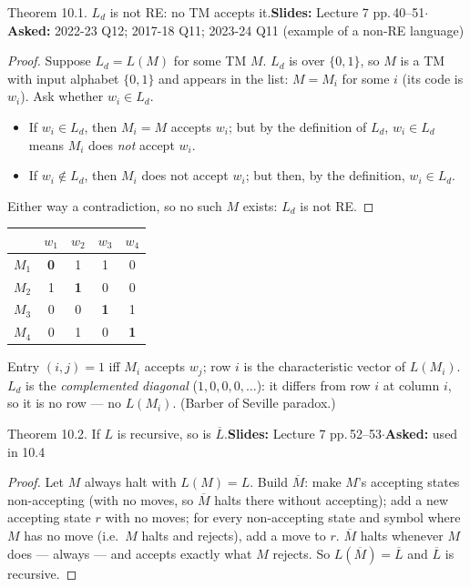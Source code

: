 \documentclass[10.5pt,a4paper]{article}
\newcommand{\src}[2]{{\footnotesize\color{gray!70!black}\textbf{Slides:} #1\enspace$\cdot$\enspace\textbf{Asked:} #2}\par}
\newcommand{\Ld}{L_d}
\begin{document}
\begin{thm}{Theorem 10.1. $\Ld$ is not RE: no TM accepts it.}\src{Lecture 7 pp.\,40--51}{2022-23 Q12; 2017-18 Q11; 2023-24 Q11 (example of a non-RE language)}\end{thm}
\begin{proof}
Suppose $\Ld=L(M)$ for some TM $M$. $\Ld$ is over $\{0,1\}$, so $M$ is a TM with input alphabet $\{0,1\}$ and appears in the list: $M=M_i$
for some $i$ (its code is $w_i$). Ask whether $w_i\in\Ld$.
\begin{itemize}
\item If $w_i\in\Ld$, then $M_i=M$ accepts $w_i$; but by the definition of $\Ld$, $w_i\in\Ld$ means $M_i$ does \emph{not} accept $w_i$.
\item If $w_i\notin\Ld$, then $M_i$ does not accept $w_i$; but then, by the definition, $w_i\in\Ld$.
\end{itemize}
Either way a contradiction, so no such $M$ exists: $\Ld$ is not RE.
\end{proof}
\begin{center}\small
\begin{tabular}{c|cccc}
 & $w_1$ & $w_2$ & $w_3$ & $w_4$ \\\hline
$M_1$ & \textbf{\color{trapborder}0} & 1 & 1 & 0\\
$M_2$ & 1 & \textbf{\color{trapborder}1} & 0 & 0\\
$M_3$ & 0 & 0 & \textbf{\color{trapborder}1} & 1\\
$M_4$ & 0 & 1 & 0 & \textbf{\color{trapborder}1}
\end{tabular}\qquad
\begin{minipage}{0.5\linewidth}\footnotesize
Entry $(i,j)=1$ iff $M_i$ accepts $w_j$; row $i$ is the characteristic vector of $L(M_i)$. $\Ld$ is the \emph{complemented diagonal}
($1,0,0,0,\dots$): it differs from row $i$ at column $i$, so it is no row --- no $L(M_i)$. (Barber of Seville paradox.)
\end{minipage}
\end{center}

\begin{thm}{Theorem 10.2. If $L$ is recursive, so is $\overline L$.}\src{Lecture 7 pp.\,52--53}{used in 10.4}\end{thm}
\begin{proof}
Let $M$ always halt with $L(M)=L$. Build $\overline M$: make $M$'s accepting states non-accepting (with no moves, so $\overline M$ halts there
without accepting); add a new accepting state $r$ with no moves; for every non-accepting state and symbol where $M$ has no move (i.e.\ $M$ halts
and rejects), add a move to $r$. $\overline M$ halts whenever $M$ does --- always --- and accepts exactly what $M$ rejects. So
$L(\overline M)=\overline L$ and $\overline L$ is recursive.
\end{proof}
\end{document}
